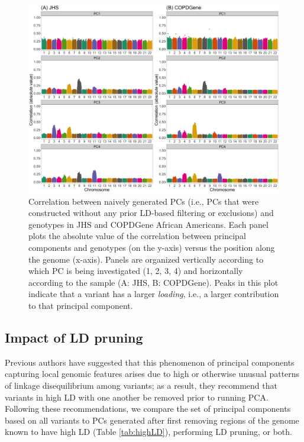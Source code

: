 \documentclass[12pt]{article}
\begin{document}
\begin{figure}
\center
\includegraphics[width=\textwidth]{figs/pc_geno_corr/topmed_corr}
\caption{Correlation between naively generated PCs (i.e., PCs that were constructed without any prior LD-based filtering or exclusions) and genotypes in JHS and COPDGene African Americans. Each panel plots the absolute value of the correlation between principal components and genotypes (on the y-axis) versus the position along the genome (x-axis).  Panels are organized vertically according to which PC is being investigated (1, 2, 3, 4) and horizontally according to the sample (A: JHS, B: COPDGene). Peaks in this plot indicate that a variant has a larger \textit{loading}, i.e., a larger contribution to that principal component.}
\label{fig:corr-TOPMed}
\end{figure}


\subsection{Impact of LD pruning}

Previous authors have suggested that this phenomenon of principal components capturing local genomic features arises due to high or otherwise unusual patterns of linkage disequilibrium among variants; as a result, they recommend that variants in high LD with one another be removed prior to running PCA. 
Following these recommendations, we compare the set of principal components based on all variants to PCs generated after first removing regions of the genome known to have high LD (Table \ref{tab:highLD}), performing LD pruning, or both. 
\end{document}

